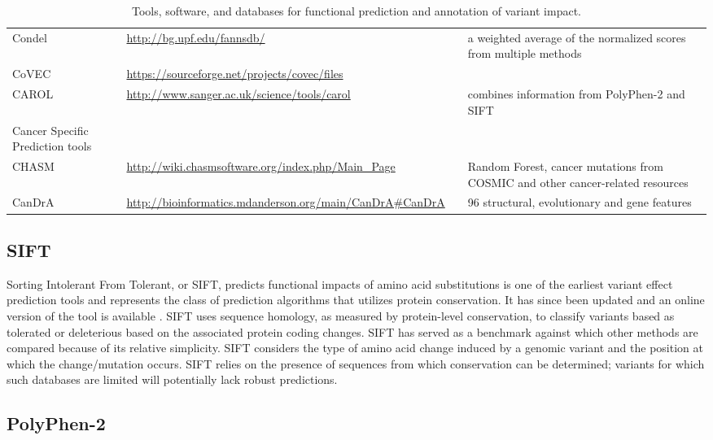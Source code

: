 \documentclass{article}
\begin{document}
\begin{table}[p]
\begin{tabularx}{\textwidth}{p{3cm}Xp{1.7cm}X}
  Condel & \url{http://bg.upf.edu/fannsdb/} & \cite{Gonzalez-Perez2011-gc} & a weighted average of the normalized scores from multiple methods \\
  CoVEC & \url{https://sourceforge.net/projects/covec/files} &   &   \\
  CAROL & \url{http://www.sanger.ac.uk/science/tools/carol} & \cite{Lopes2012-je} & combines information from PolyPhen-2 and SIFT \\
  Cancer Specific Prediction tools &  &  &   \\
  CHASM & \url{http://wiki.chasmsoftware.org/index.php/Main_Page} & \cite{Carter2009-ci} & Random Forest, cancer mutations from COSMIC and other cancer-related resources \\
  CanDrA & \url{http://bioinformatics.mdanderson.org/main/CanDrA\#CanDrA} & \cite{Mao2013-ie} & 96  structural, evolutionary and gene features  \\
   \hline
\end{tabularx}
\caption{Tools, software, and databases for functional prediction and annotation of variant impact. }
\label{table:2}
\end{table}

\subsection{SIFT}

Sorting Intolerant From Tolerant, or SIFT, predicts functional impacts
of amino acid substitutions \cite{Ng2003-vp} is one of the earliest
variant effect prediction tools and represents the class of prediction
algorithms that utilizes protein conservation. It has since been
updated and an online version of the tool is available
\cite{Kumar2009-gd}. SIFT uses sequence homology, as measured by
protein-level conservation, to classify variants based as tolerated or
deleterious based on the associated protein coding changes. SIFT has
served as a benchmark against which other methods are compared because
of its relative simplicity. SIFT considers the type of amino acid
change induced by a genomic variant and the position at which the
change/mutation occurs. SIFT relies on the presence of sequences from
which conservation can be determined; variants for which such
databases are limited will potentially lack robust predictions.

\subsection{PolyPhen-2}
\end{document}
